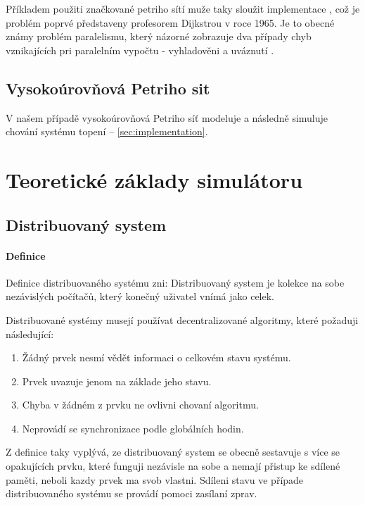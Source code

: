 Příkladem použiti značkované petriho sítí muže taky sloužit implementace  \cite[p.65--67]{PNandMoS}, což je problém poprvé představeny profesorem Dijkstrou v roce 1965.
Je to obecné známy problém paralelismu, který názorné zobrazuje dva případy chyb vznikajících pri paralelním vypočtu - vyhladověni a uváznutí \cite{dining_philosophers}.

\subsection{Vysokoúrovňová Petriho sit}

\todo{}
V našem případě vysokoúrovňová Petriho síť modeluje a následně simuluje chování systému topení -- \ref{sec:implementation}.

\section{Teoretické základy simulátoru}


\subsection{Distribuovaný system}
\label{subsec:distr_system}

\paragraph{Definice}

Definice distribuovaného systému zni:
Distribuovaný system je kolekce na sobe nezávislých počítačů, který konečný uživatel vnímá jako celek.

Distribuované systémy musejí používat decentralizované algoritmy, které požaduji následující:
\begin{enumerate}
  \item Žádný prvek nesmí vědět informaci o celkovém stavu systému.
  \item Prvek uvazuje jenom na základe jeho stavu.
  \item Chyba v žádném z prvku ne ovlivni chovaní algoritmu.
  \item Neprovádí se synchronizace podle globálních hodin.
\end{enumerate}

Z definice taky vyplývá, ze distribuovaný system se obecně sestavuje s více se opakujících prvku, které funguji nezávisle na sobe a nemají přistup ke sdílené paměti, neboli kazdy prvek ma svob vlastni. Sdíleni stavu ve případe distribuovaného systému se provádí pomoci zasílaní zprav.

